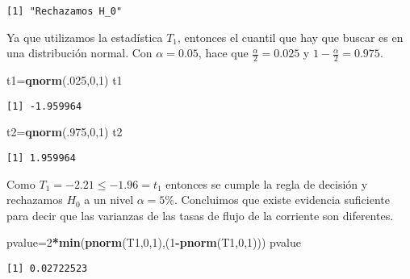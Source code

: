 \documentclass[
  a4paper,
  oneside,
  openany]{book}
\newenvironment{Shaded}{\begin{snugshade}}{\end{snugshade}}
\newcommand{\DecValTok}[1]{\textcolor[rgb]{0.00,0.00,0.81}{#1}}
\newcommand{\FunctionTok}[1]{\textcolor[rgb]{0.13,0.29,0.53}{\textbf{#1}}}
\newcommand{\NormalTok}[1]{#1}
\newcommand{\OtherTok}[1]{\textcolor[rgb]{0.56,0.35,0.01}{#1}}
\newcommand{\SpecialCharTok}[1]{\textcolor[rgb]{0.81,0.36,0.00}{\textbf{#1}}}
\begin{document}
\begin{verbatim}
[1] "Rechazamos H_0"
\end{verbatim}

Ya que utilizamos la estadística \(T_1\), entonces el cuantil que hay que buscar es en una distribución normal. Con \(\alpha=0.05\), hace que \(\frac{\alpha}{2}=0.025\) y \(1-\frac{\alpha}{2}=0.975.\)

\begin{Shaded}
\begin{Highlighting}[]
\NormalTok{t1}\OtherTok{=}\FunctionTok{qnorm}\NormalTok{(.}\DecValTok{025}\NormalTok{,}\DecValTok{0}\NormalTok{,}\DecValTok{1}\NormalTok{)}
\NormalTok{t1}
\end{Highlighting}
\end{Shaded}

\begin{verbatim}
[1] -1.959964
\end{verbatim}

\begin{Shaded}
\begin{Highlighting}[]
\NormalTok{t2}\OtherTok{=}\FunctionTok{qnorm}\NormalTok{(.}\DecValTok{975}\NormalTok{,}\DecValTok{0}\NormalTok{,}\DecValTok{1}\NormalTok{)}
\NormalTok{t2}
\end{Highlighting}
\end{Shaded}

\begin{verbatim}
[1] 1.959964
\end{verbatim}

Como \(T_1=-2.21\leq -1.96 =t_1\) entonces se cumple la regla de decisión y rechazamos \(H_0\) a un nivel \(\alpha=5\%\). Concluimos que existe evidencia suficiente para decir que las varianzas de las tasas de flujo de la corriente son diferentes.

\begin{Shaded}
\begin{Highlighting}[]
\NormalTok{pvalue}\OtherTok{=}\DecValTok{2}\SpecialCharTok{*}\FunctionTok{min}\NormalTok{(}\FunctionTok{pnorm}\NormalTok{(T1,}\DecValTok{0}\NormalTok{,}\DecValTok{1}\NormalTok{),(}\DecValTok{1}\SpecialCharTok{{-}}\FunctionTok{pnorm}\NormalTok{(T1,}\DecValTok{0}\NormalTok{,}\DecValTok{1}\NormalTok{)))}
\NormalTok{pvalue}
\end{Highlighting}
\end{Shaded}

\begin{verbatim}
[1] 0.02722523
\end{verbatim}
\end{document}
